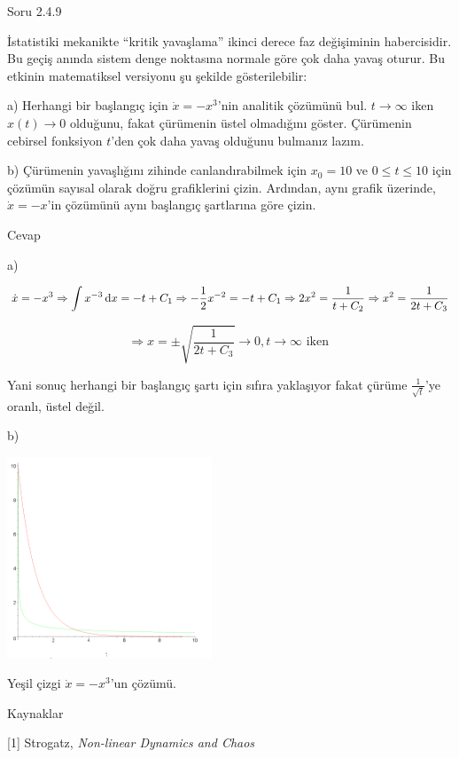 \documentclass[12pt,fleqn]{article}\usepackage{../../common}
\begin{document}
Soru 2.4.9

İstatistiki mekanikte ``kritik yavaşlama'' ikinci derece faz değişiminin
habercisidir. Bu geçiş anında sistem denge noktasına normale göre çok daha yavaş
oturur. Bu etkinin matematiksel versiyonu şu şekilde gösterilebilir:

a) Herhangi bir başlangıç için $\dot{x} = -x^3$'nin analitik çözümünü bul. $t
\to \infty$ iken $x(t) \to 0$ olduğunu, fakat çürümenin üstel olmadığını
göster. Çürümenin cebirsel fonksiyon $t$'den çok daha yavaş olduğunu bulmanız
lazım.

b) Çürümenin yavaşlığını zihinde canlandırabilmek için $x_0=10$ ve $0 \le t \le
10$ için çözümün sayısal olarak doğru grafiklerini çizin. Ardından, aynı grafik
üzerinde, $\dot{x}=-x$'in çözümünü aynı başlangıç şartlarına göre çizin. 

Cevap

a)

$$
\dot{x} = -x^3 \Rightarrow \int x^{-3} \,\mathrm{d} x = -t + C_1 \Rightarrow
-\frac{1}{2}x^{-2} = -t + C_1 \Rightarrow 2x^2 = \frac{1}{t + C_2} \Rightarrow
x^2 = \frac{1}{2t + C_3}
$$

$$ \Rightarrow x = \pm \sqrt{\frac{1}{2t + C_3}} \to 0,
t \to \infty \textrm{ iken }$$

Yani sonuç herhangi bir başlangıç şartı için sıfıra yaklaşıyor fakat çürüme
$\frac{1}{\sqrt{t}}$'ye oranlı, üstel değil.

b)

\includegraphics[height=6cm]{03_15.png}

Yeşil çizgi $\dot{x} = -x^3$'un çözümü. 


Kaynaklar

[1] Strogatz, {\em Non-linear Dynamics and Chaos}
\end{document}

